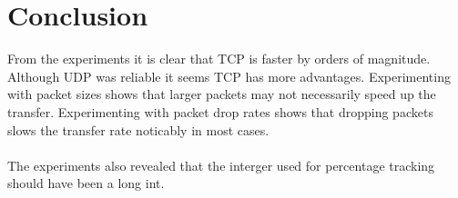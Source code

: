 \documentclass[a4paper,10pt]{article}
\begin{document}
\section{Conclusion}
From the experiments it is clear that TCP is faster by orders of magnitude.
Although UDP was reliable it seems TCP has more advantages.
Experimenting with packet sizes shows that larger packets may not necessarily
speed up the transfer.
Experimenting with packet drop rates shows that dropping packets slows the
transfer rate noticably in most cases.\\\\
The experiments also revealed that the interger used for percentage tracking
should have been a long int.

\pagebreak


\end{document}
